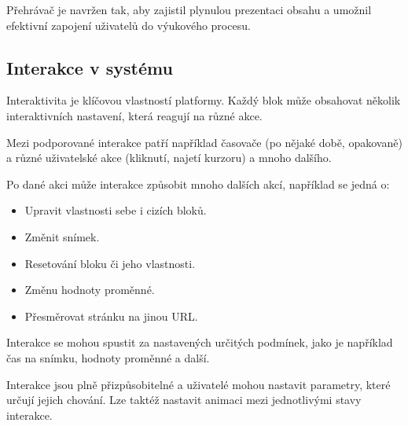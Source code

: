 Přehrávač je navržen tak, aby zajistil plynulou prezentaci obsahu a umožnil efektivní zapojení uživatelů do výukového procesu.

\subsection{Interakce v systému}

Interaktivita je klíčovou vlastností platformy.
Každý blok může obsahovat několik interaktivních nastavení, která reagují na různé akce. 

Mezi podporované interakce patří například časovače (po nějaké době, opakovaně) a různé uživatelské akce (kliknutí, najetí kurzoru) a mnoho dalšího. 

Po dané akci může interakce způsobit mnoho dalších akcí, například se jedná o:

\begin{itemize}
    \item Upravit vlastnosti sebe i cizích bloků.
    \item Změnit snímek.
    \item Resetování bloku či jeho vlastnosti.
    \item Změnu hodnoty proměnné. 
    \item Přesměrovat stránku na jinou URL.
\end{itemize}

Interakce se mohou spustit za nastavených určitých podmínek, jako je například čas na snímku, hodnoty proměnné a další.

Interakce jsou plně přizpůsobitelné a uživatelé mohou nastavit parametry, které určují jejich chování.
Lze taktéž nastavit animaci mezi jednotlivými stavy interakce.


    

